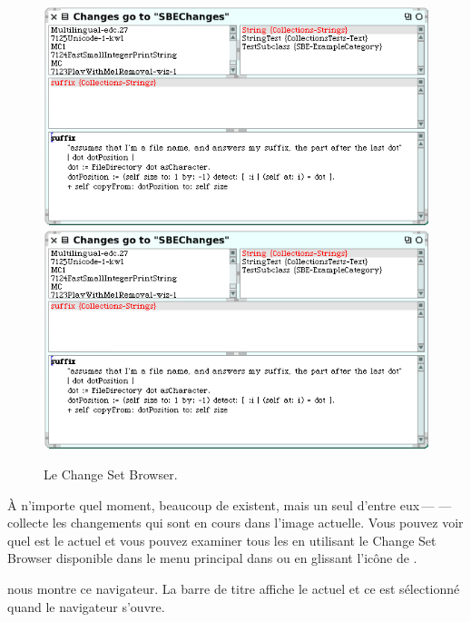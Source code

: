 \documentclass[a4paper,10pt,twoside]{book}
\begin{document}
\begin{figure}[btp]
	\begin{center}
	\ifluluelse
		{\includegraphics [width=\textwidth]{changeSetBrowser}}
		{\includegraphics[scale=0.7]{changeSetBrowser}}
	\end{center}
	\caption{Le Change Set Browser.}
	\label{fig:changeSetBrowser}
\end{figure}

\`A n'importe quel moment, beaucoup de \changesets existent, mais un seul d'entre eux\,---\,\,---\,collecte les changements qui sont en cours dans l'image actuelle.
Vous pouvez voir quel \changeset est le \changeset actuel et vous pouvez examiner
tous les \changesets en utilisant le Change Set Browser disponible dans le menu
principal dans  ou en glissant l'ic\^one
 de \toolsflapind.

 nous montre ce navigateur. La barre de titre affiche le \changeset actuel et ce \changeset est s\'electionn\'e quand le navigateur s'ouvre.
\end{document}
